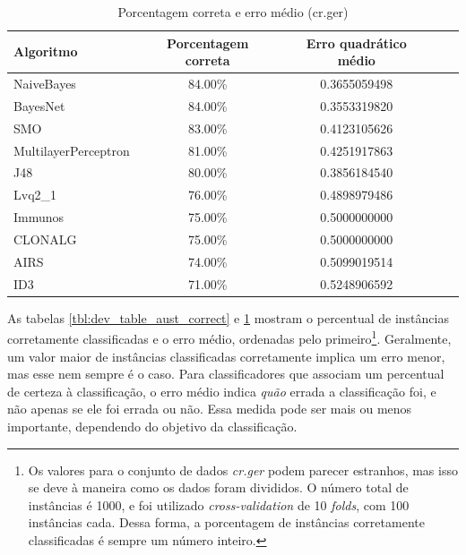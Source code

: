 \begin{table}[h]
    \centering
    \caption{Porcentagem correta e erro médio (cr.ger)}
    \label{tbl:dev_table_ger_correct}
    \vspace{0.5cm}
    \begin{tabular}{|l|c|c|c|c|}
        \hline
        \textbf{Algoritmo} & \textbf{Porcentagem correta} & \textbf{Erro quadrático médio} \\
        \hline
        \rowcolor[gray]{.9}
        NaiveBayes           & 84.00\% & 0.3655059498 \\ \hline
        \rowcolor[gray]{.9}
        BayesNet             & 84.00\% & 0.3553319820 \\ \hline
        \rowcolor[gray]{.9}
        SMO                  & 83.00\% & 0.4123105626 \\ \hline
        MultilayerPerceptron & 81.00\% & 0.4251917863 \\ \hline
        J48                  & 80.00\% & 0.3856184540 \\ \hline
        Lvq2\_1              & 76.00\% & 0.4898979486 \\ \hline
        Immunos              & 75.00\% & 0.5000000000 \\ \hline
        CLONALG              & 75.00\% & 0.5000000000 \\ \hline
        AIRS                 & 74.00\% & 0.5099019514 \\ \hline
        ID3                  & 71.00\% & 0.5248906592 \\ \hline
    \end{tabular}
\end{table}

As tabelas \ref{tbl:dev_table_aust_correct} e \ref{tbl:dev_table_ger_correct} mostram o percentual de instâncias corretamente classificadas e o erro médio, ordenadas pelo primeiro\footnote{Os valores para o conjunto de dados \emph{cr.ger} podem parecer estranhos, mas isso se deve à maneira como os dados foram divididos. O número total de instâncias é 1000, e foi utilizado \emph{cross-validation} de 10 \emph{folds}, com 100 instâncias cada. Dessa forma, a porcentagem de instâncias corretamente classificadas é sempre um número inteiro.}. Geralmente, um valor maior de instâncias classificadas corretamente implica um erro menor, mas esse nem sempre é o caso. Para classificadores que associam um percentual de certeza à classificação, o erro médio indica \emph{quão} errada a classificação foi, e não apenas se ele foi errada ou não. Essa medida pode ser mais ou menos importante, dependendo do objetivo da classificação.

